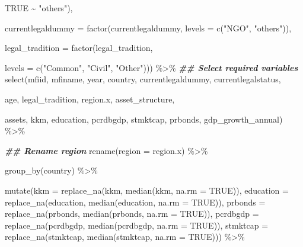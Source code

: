 \documentclass[a4paper,nobind]{templates/ociamthesis}
\newenvironment{Shaded}{\begin{snugshade}}{\end{snugshade}}
\newcommand{\AttributeTok}[1]{\textcolor[rgb]{0.77,0.63,0.00}{#1}}
\newcommand{\ConstantTok}[1]{\textcolor[rgb]{0.00,0.00,0.00}{#1}}
\newcommand{\DocumentationTok}[1]{\textcolor[rgb]{0.56,0.35,0.01}{\textbf{\textit{#1}}}}
\newcommand{\FunctionTok}[1]{\textcolor[rgb]{0.00,0.00,0.00}{#1}}
\newcommand{\NormalTok}[1]{#1}
\newcommand{\SpecialCharTok}[1]{\textcolor[rgb]{0.00,0.00,0.00}{#1}}
\newcommand{\StringTok}[1]{\textcolor[rgb]{0.31,0.60,0.02}{#1}}
\renewenvironment{Shaded}
{
  \vspace{10pt}%
  \begin{snugshade}%
}{%
  \end{snugshade}%
  \vspace{8pt}%
}
\begin{document}
\begin{Shaded}
\begin{Highlighting}[]
                                           \ConstantTok{TRUE} \SpecialCharTok{\textasciitilde{}} \StringTok{"others"}\NormalTok{),}
      
        \AttributeTok{currentlegaldummy =} \FunctionTok{factor}\NormalTok{(currentlegaldummy, }\AttributeTok{levels =} \FunctionTok{c}\NormalTok{(}\StringTok{"NGO"}\NormalTok{, }\StringTok{"others"}\NormalTok{)),}
        
        \AttributeTok{legal\_tradition =} \FunctionTok{factor}\NormalTok{(legal\_tradition, }
                                 
                                 \AttributeTok{levels =} \FunctionTok{c}\NormalTok{(}\StringTok{"Common"}\NormalTok{, }\StringTok{"Civil"}\NormalTok{, }\StringTok{"Other"}\NormalTok{))) }\SpecialCharTok{\%\textgreater{}\%} 
  \DocumentationTok{\#\# Select required variables }
  \FunctionTok{select}\NormalTok{(mfiid, mfiname, year, country, currentlegaldummy, currentlegalstatus, }
         
\NormalTok{         age, legal\_tradition, region.x, asset\_structure, }
         
\NormalTok{         assets, kkm, education, pcrdbgdp, stmktcap, prbonds, gdp\_growth\_annual) }\SpecialCharTok{\%\textgreater{}\%} 
  
          \DocumentationTok{\#\# Rename region}
         \FunctionTok{rename}\NormalTok{(}\AttributeTok{region =}\NormalTok{ region.x) }\SpecialCharTok{\%\textgreater{}\%} 
  
  \FunctionTok{group\_by}\NormalTok{(country) }\SpecialCharTok{\%\textgreater{}\%} 
  
  \FunctionTok{mutate}\NormalTok{(}\AttributeTok{kkm =} \FunctionTok{replace\_na}\NormalTok{(kkm, }\FunctionTok{median}\NormalTok{(kkm, }\AttributeTok{na.rm =} \ConstantTok{TRUE}\NormalTok{)),}
         \AttributeTok{education =} \FunctionTok{replace\_na}\NormalTok{(education, }\FunctionTok{median}\NormalTok{(education, }\AttributeTok{na.rm =} \ConstantTok{TRUE}\NormalTok{)),}
         \AttributeTok{prbonds =} \FunctionTok{replace\_na}\NormalTok{(prbonds, }\FunctionTok{median}\NormalTok{(prbonds, }\AttributeTok{na.rm =} \ConstantTok{TRUE}\NormalTok{)),}
         \AttributeTok{pcrdbgdp =} \FunctionTok{replace\_na}\NormalTok{(pcrdbgdp, }\FunctionTok{median}\NormalTok{(pcrdbgdp, }\AttributeTok{na.rm =} \ConstantTok{TRUE}\NormalTok{)),}
         \AttributeTok{stmktcap =} \FunctionTok{replace\_na}\NormalTok{(stmktcap, }\FunctionTok{median}\NormalTok{(stmktcap, }\AttributeTok{na.rm =} \ConstantTok{TRUE}\NormalTok{))) }\SpecialCharTok{\%\textgreater{}\%} 
  

\end{Highlighting}
\end{Shaded}
\end{document}
